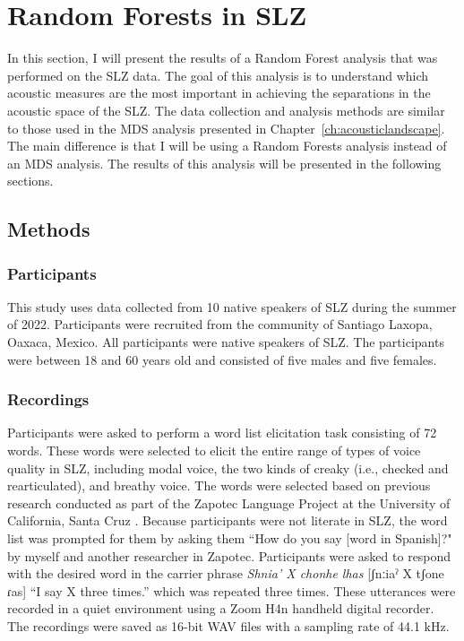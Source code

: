 \section{Random Forests in SLZ} \label{sec:bagging_slz}

In this section, I will present the results of a Random Forest analysis that was performed on the SLZ data. The goal of this analysis is to understand which acoustic measures are the most important in achieving the separations in the acoustic space of the SLZ. The data collection and analysis methods are similar to those used in the MDS analysis presented in Chapter~\ref{ch:acousticlandscape}. The main difference is that I will be using a Random Forests analysis instead of an MDS analysis. The results of this analysis will be presented in the following sections.

\subsection{Methods} \label{sec:methods}
\subsubsection{Participants} \label{sec:participants}
This study uses data collected from 10 native speakers of SLZ during the summer of 2022. Participants were recruited from the community of Santiago Laxopa, Oaxaca, Mexico. All participants were native speakers of SLZ. The participants were between 18 and 60 years old and consisted of five males and five females.

\subsubsection{Recordings} \label{sec:recordings} 
Participants were asked to perform a word list elicitation task consisting of 72 words. These words were selected to elicit the entire range of types of voice quality in SLZ, including modal voice, the two kinds of creaky (i.e., checked and rearticulated), and breathy voice. The words were selected based on previous research conducted as part of the Zapotec Language Project at the University of California, Santa Cruz \citep{ZapotecLanguageProject}. 
Because participants were not literate in SLZ, the word list was prompted for them by asking them ``How do you say [word in Spanish]?" by myself and another researcher in Zapotec. Participants were asked to respond with the desired word in the carrier phrase \textit{Shnia' X chonhe lhas} [ʃnːiaˀ X tʃone ɾas] ``I say X three times.'' which was repeated three times. These utterances were recorded in a quiet environment using a Zoom H4n handheld digital recorder. The recordings were saved as 16-bit WAV files with a sampling rate of 44.1 kHz.

